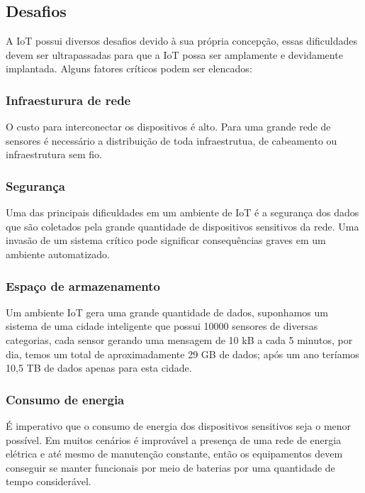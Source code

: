 
\subsection{Desafios}
	\quad A \acrlong{IoT} possui diversos desafios devido à sua própria concepção, essas dificuldades devem ser ultrapassadas para que a
	\acrshort{IoT} possa ser amplamente e devidamente implantada. Alguns fatores críticos podem ser elencados:
	\subsubsection{Infraesturura de rede}
		\quad O custo para interconectar os dispositivos é alto. Para uma grande rede de sensores é necessário a distribuição de toda infraestrutua,
		de cabeamento ou infraestrutura sem fio.
	\subsubsection{Segurança}
		\quad Uma das principais dificuldades em um ambiente de \acrlong{IoT} é a segurança dos dados que são coletados pela grande quantidade de
		dispositivos sensitivos da rede. Uma invasão de um sistema crítico pode significar consequências graves em um ambiente automatizado.
  \subsubsection{Espaço de armazenamento}
	  \quad Um ambiente \acrshort{IoT} gera uma grande quantidade de dados, suponhamos um sistema de uma cidade inteligente que possui 10000 sensores
 	  de diversas categorias, cada sensor gerando uma mensagem de 10 kB a cada 5 minutos, por dia, temos um total de aproximadamente 29 GB de dados;
	  após um ano teríamos 10,5 TB de dados apenas para esta cidade.
  \subsubsection{Consumo de energia}
		\quad É imperativo que o consumo de energia dos dispositivos sensitivos seja o menor possível. Em muitos cenários é improvável a presença de uma
		rede de energia elétrica e até mesmo de manutenção constante, então os equipamentos devem conseguir se manter funcionais por meio de baterias por
		uma quantidade de tempo considerável.


